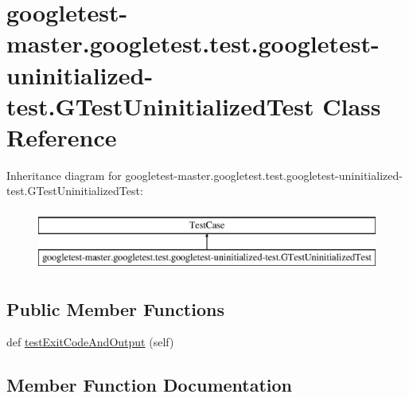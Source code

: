 \hypertarget{classgoogletest-master_1_1googletest_1_1test_1_1googletest-uninitialized-test_1_1_g_test_uninitialized_test}{}\section{googletest-\/master.googletest.\+test.\+googletest-\/uninitialized-\/test.G\+Test\+Uninitialized\+Test Class Reference}
\label{classgoogletest-master_1_1googletest_1_1test_1_1googletest-uninitialized-test_1_1_g_test_uninitialized_test}
Inheritance diagram for googletest-\/master.googletest.\+test.\+googletest-\/uninitialized-\/test.G\+Test\+Uninitialized\+Test\+:\begin{figure}[H]
\begin{center}
\leavevmode
\includegraphics[height=2.000000cm]{d9/d6e/classgoogletest-master_1_1googletest_1_1test_1_1googletest-uninitialized-test_1_1_g_test_uninitialized_test}
\end{center}
\end{figure}
\subsection*{Public Member Functions}
\begin{DoxyCompactItemize}
\item 
def \mbox{\hyperlink{classgoogletest-master_1_1googletest_1_1test_1_1googletest-uninitialized-test_1_1_g_test_uninitialized_test_a91cff97556330b0e73455a28e32c97a0}{test\+Exit\+Code\+And\+Output}} (self)
\end{DoxyCompactItemize}


\subsection{Member Function Documentation}
\mbox{\label{classgoogletest-master_1_1googletest_1_1test_1_1googletest-uninitialized-test_1_1_g_test_uninitialized_test_a91cff97556330b0e73455a28e32c97a0}} 
